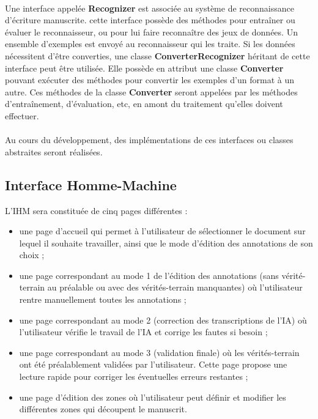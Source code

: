 \paragraph{}
Une interface appelée \textbf{Recognizer} est associée au système de
reconnaissance d’écriture manuscrite. cette interface possède des méthodes
pour entraîner ou  évaluer le reconnaisseur, ou pour lui faire reconnaître
des jeux de données. Un ensemble d’exemples est envoyé au reconnaisseur qui
les traite. Si les données nécessitent d’être converties, une classe
\textbf{ConverterRecognizer} héritant de cette interface peut être utilisée.
Elle possède en attribut une classe \textbf{Converter} pouvant exécuter des
méthodes pour convertir les exemples d’un format à un autre. Ces méthodes de
la classe \textbf{Converter} seront appelées par les méthodes d’entraînement,
d’évaluation, etc, en amont du traitement qu’elles doivent effectuer.

\paragraph{}
Au cours du développement, des implémentations de ces interfaces ou classes
abstraites seront réalisées.

\subsection{Interface Homme-Machine}

L’IHM sera constituée de cinq pages différentes :
\begin{itemize}
\item une page d’accueil qui permet à l’utilisateur de sélectionner le document
sur lequel il souhaite travailler, ainsi que le mode d’édition des annotations
de son choix ;
\item une page correspondant au mode 1 de l’édition des annotations
(sans vérité-terrain au préalable ou avec des vérités-terrain manquantes) où
l’utilisateur rentre manuellement toutes les annotations ;
\item une page correspondant au mode 2 (correction des transcriptions de l’IA)
où l’utilisateur vérifie le travail de l’IA et corrige les fautes si besoin ;
\item une page correspondant au mode 3 (validation finale) où les
vérités-terrain ont été préalablement validées par l’utilisateur. Cette page
propose une lecture rapide pour corriger les éventuelles erreurs restantes ;
\item une page d’édition des zones où l’utilisateur peut définir et modifier
les différentes zones qui découpent le manuscrit.
\end{itemize}

